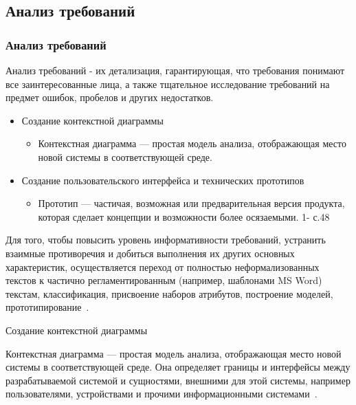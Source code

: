 \documentclass{../industrial-development}
\begin{document}
\subsection{Анализ требований}
\begin{frame} \frametitle{Анализ требований}
  \begin{block}{}
   \alert{Анализ требований} - их детализация, гарантирующая, что требования понимают все заинтересованные лица, а также тщательное исследование требований на предмет ошибок, пробелов и других недостатков.
  \end{block}

	
\begin{itemize}

\item \alert{Создание контекстной диаграммы} 

\begin{itemize}
\item Контекстная диаграмма — простая модель анализа, отображающая место новой системы в соответствующей среде.
\end{itemize}

\item \alert{Создание пользовательского интерфейса и технических прототипов} 

\begin{itemize}
\item Прототип — частичая, возможная или предварительная версия продукта, которая сделает концепции и возможности более осязаемыми. 1- с.48
\end{itemize}

\end{itemize}

\end{frame}

\lecturenotes

Для того, чтобы повысить уровень информативности требований, устранить взаимные противоречия и добиться выполнения их других основных характеристик,
осуществляется переход от полностью неформализованных текстов к частично
регламентированным (например, шаблонами MS Word) текстам, классификация,
присвоение наборов атрибутов, построение моделей, прототипирование~\cite[с.~40]{Maglinec}.

\alert{Создание контекстной диаграммы}

Контекстная диаграмма — простая модель анализа, отображающая место новой системы в соответствующей среде. Она определяет границы и интерфейсы между разрабатываемой системой и сущностями, внешними для этой системы, например пользователями, устройствами и прочими информационными системами~\cite[с.~48]{Wiegers}.
\end{document}
